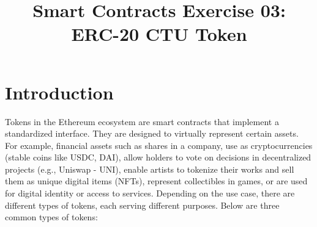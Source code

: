 \documentclass[12pt]{article}
\title{Smart Contracts Exercise 03: \\ ERC-20 CTU Token}
\author{}
\date{}
\begin{document}
\maketitle
\section{Introduction}

Tokens in the Ethereum ecosystem are smart contracts that implement a standardized interface. They are designed to virtually represent certain assets. For example, financial assets such as shares in a company, use as cryptocurrencies (stable coins like USDC, DAI), allow holders to vote on decisions in decentralized projects (e.g., Uniswap - UNI), enable artists to tokenize their works and sell them as unique digital items (NFTs), represent collectibles in games, or are used for digital identity or access to services. Depending on the use case, there are different types of tokens, each serving different purposes. Below are three common types of tokens:
\end{document}
